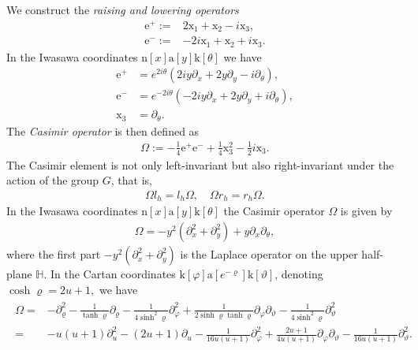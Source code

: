 \documentclass[12pt]{amsart}
\theoremstyle{definition}
\theoremstyle{remark}
\numberwithin{equation}{section}
\newcommand{\1}{{\mathbf 1}}
\begin{document}
We construct the \emph{raising and lowering operators}
\begin{align*}
    \mathrm{e}^+ :=& 2 \mathrm{x}_1 + \mathrm{x}_2-i\mathrm{x}_3, \\
      \mathrm{e}^- :=& -2i \mathrm{x}_1 + \mathrm{x}_2+i\mathrm{x}_3.
\end{align*}
In the Iwasawa coordinates  $ \mathrm{n}[x] \mathrm{a}[y] \mathrm{k}[\theta]$ we have
\begin{align*}
\mathrm{e}^+  &= e^{2i\theta} (2iy\partial_x + 2 y \partial_y-i\partial_\theta),\\
\mathrm{e}^- &= e^{-2i\theta}(-2iy\partial_x + 2 y \partial_y+i\partial_\theta),\\
\mathrm{x}_3 &= \partial_\theta.
\end{align*}
The \emph{Casimir operator} is then defined as
\begin{align}
    \Omega := -\frac{1}{4}  \mathrm{e}^{+}  \mathrm{e}^{-} + \frac{1}{4}\mathrm{x}_3^2 - \frac{1}{2} i \mathrm{x}_3.
\end{align}
The Casimir element is not only left-invariant but also right-invariant under the action of the group $G$, that is,
\begin{align}\label{eq:Omegalrcommute}
    \Omega l_h =  l_h \Omega, \quad  \Omega r_h =  r_h \Omega.
\end{align}
In the Iwasawa coordinates $ \mathrm{n}[x] \mathrm{a}[y] \mathrm{k}[\theta]$ the Casimir operator $\Omega$   is given by
\begin{align} \label{eq:casimiriwasawa}
    \Omega = -y^2 (\partial_x^2 + \partial_y^2) + y \partial_x \partial_\theta,
\end{align}
where the first part $-y^2 (\partial_x^2 + \partial_y^2)$ is the Laplace operator on the upper half-plane $\mathbb{H}$.
In the Cartan coordinates $\mathrm{k}[\varphi] \mathrm{a}[e^{-\varrho}]\mathrm{k}[\vartheta]$, denoting  $\cosh \varrho =2u+1,$ we have
\begin{align} \label{eq:casimircartan}
\begin{split}
    \Omega =&  - \partial_\varrho^2 - \frac{1}{\tanh \varrho} \partial_\varrho -\frac{1}{4\sinh^2 \varrho} \partial_\varphi^2  +\frac{1}{2 \sinh\varrho \tanh \varrho} \partial_\varphi \partial_\vartheta - \frac{1}{4 \sinh^2 \varrho}  \partial_\vartheta^2 \\
        =& -u(u+1) \partial_u^2 - (2u+1) \partial_u - \frac{1}{16u(u+1)}  \partial_\varphi^2   +   \frac{2u+1}{4 u(u+1)}\partial_\varphi \partial_\vartheta -  \frac{1}{16u(u+1)} \partial_\vartheta^2 .
\end{split}
\end{align}
\end{document}
